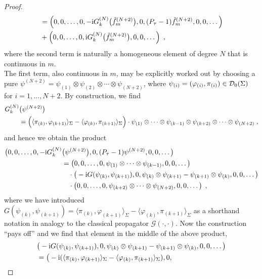 \begin{proof}
\begin{align}
&= \left(0,0,\dots,0,-\text{\upshape{i}} G^{(N)}_k\big( \tilde{f}_m^{(N+2)}\big)  , 0, (P_\tau - 1)\tilde{f}_m^{(N+2)} ,0,0,\dots\right) \notag \\
&+ \left( 0,0,\dots,0,\text{\upshape{i}} G^{(N)}_k\big( \tilde{f}_m^{(N+2)}\big)  , 0, 0,\dots \right) \;,
\end{align}
where the second term is naturally a homogeneous element of degree $N$ that is continuous in $m$.\\
The first term, also continuous in $m$, may be explicitly worked out by choosing a pure $\psi^{(N+2)} = \psi_{(1)} \otimes \psi_{(2)} \otimes \cdots \otimes \psi_{(N+2)}$, where $\psi_{(i)} = (\varphi_{(i)}, \pi_{(i)} )\in \mathcal{D}_{0}(\Sigma)$ for $i=1,\dots,N+2$.  By construction, we find
\begin{align}
	G^{(N)}_k &\big( \psi^{(N+2)} \big)  \\
	&= \Big( {\langle \pi_{(k)} , \varphi_{(k+1)} \rangle_\Sigma - \langle \varphi_{(k)} , \pi_{(k+1)} \rangle_\Sigma}\Big) \cdot  \psi_{(1)} \otimes \cdots \otimes \psi_{(k-1)} \otimes \psi_{(k+2)} \otimes \cdots \otimes \psi_{(N+2)} \;, \notag
\end{align}
and hence we obtain the product
\begin{align} \label{eqn:big_ideal_element}
\big(0,0,\dots,0,-\text{\upshape{i}}  G^{(N)}_k&\big( \psi^{(N+2)}\big)  , 0, (P_\tau - 1) \psi^{(N+2)} ,0,0,\dots\big) \notag \\
	&=\left(0,0,\dots,0,  \psi_{(1)} \otimes \cdots \otimes \psi_{(k-1)} ,0,0,\dots \right) \notag \\
	&\quad \cdot  \big( -\text{\upshape{i}} G(\psi_{(k)}  , \psi_{(k+1)})  ,  0, \psi_{(k)} \otimes  \psi_{(k+1)} - \psi_{(k+1)} \otimes \psi_{(k)},0,0,\dots   \big)   \notag \\
	&\quad\cdot \left(0,0,\dots,0, \psi_{(k+2)} \otimes \cdots \otimes \psi_{(N+2)} ,0,0,\dots \right) \;,
\end{align}
where we have introduced $G(\psi_{(k)}  , \psi_{(k+1)}) = \langle \pi_{(k)} , \varphi_{(k+1)} \rangle_\Sigma - \langle \varphi_{(k)} , \pi_{(k+1)} \rangle_\Sigma$ as a shorthand notation in analogy to the classical propagator $\mathcal G (\cdot,\cdot)$.
Now the construction ``pays off'' and we find that element in the middle of the above product,
\begin{align}
&\big( -\i G(\psi_{(k)}  , \psi_{(k+1)})   ,  0, \psi_{(k)} \otimes  \psi_{(k+1)} - \psi_{(k+1)} \otimes \psi_{(k)},0,0,\dots   \big)   \notag \\
&=  \big( -\i ( \langle \pi_{(k)} , \varphi_{(k+1)} \rangle_\Sigma - \langle \varphi_{(k)} , \pi_{(k+1)} \rangle_\Sigma )  ,  0, \notag \\

\end{align}
\end{proof}
